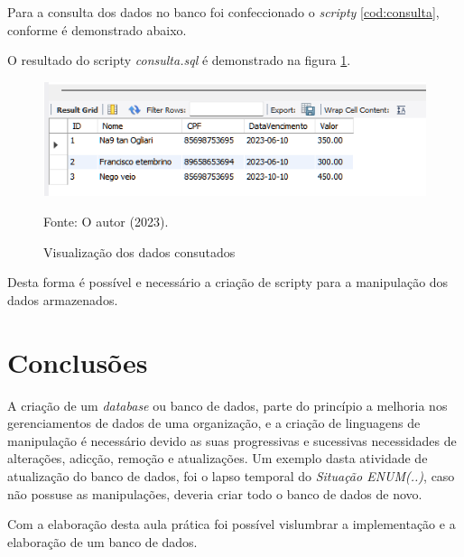 \par Para a consulta dos dados no banco foi confeccionado o \textit{scripty} \autoref{cod:consulta}, conforme é demonstrado abaixo.



\par O resultado do scripty \textit{consulta.sql} é demonstrado na figura \ref{fig:view}.

\begin{figure}[h!]
\caption{Visualização dos dados consutados}
\begin{center}
   \includegraphics[scale=1]{figure/view.png}
\end{center}
\label{fig:view}
{\fontsize{10pt}{\baselineskip}\selectfont
Fonte: O autor (2023).}
\end{figure}

\par Desta forma é possível e necessário a criação de scripty para a manipulação dos dados armazenados.


\section{Conclusões}
\par A criação de um \textit{database} ou banco de dados, parte do princípio a melhoria nos gerenciamentos de dados de uma organização, e a criação de linguagens de manipulação é necessário devido as suas progressivas e sucessivas necessidades de alterações, adicção, remoção e atualizações. Um exemplo dasta atividade de atualização do banco de dados, foi o lapso temporal do \textit{Situação ENUM(..)}, caso não possuse as manipulações, deveria criar todo o banco de dados de novo.
\par Com a elaboração desta aula prática foi possível vislumbrar a implementação e a elaboração de um banco de dados.
